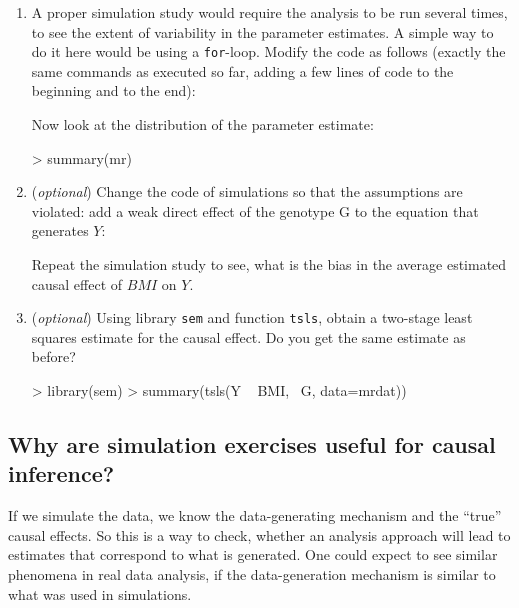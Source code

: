 \begin{enumerate}
\item  A proper simulation study would require the analysis to be run several times, to see the extent of variability in the parameter estimates. 
A simple way to do it here would be using a \verb+for+-loop. Modify the code as follows (exactly the same commands as executed so far, adding a few lines of code to the beginning and to the end):
\begin{Schunk}
\end{Schunk}
Now look at the distribution of the parameter estimate:
\begin{Schunk}
\begin{Sinput}
> summary(mr)    
\end{Sinput}
\end{Schunk}
\item (\textit{optional}) Change the code of simulations so that the assumptions are violated: add a weak direct effect of the genotype G to the equation that generates $Y$:
\begin{Schunk}
\end{Schunk}
Repeat the simulation study to see, what is the bias in the average estimated causal effect of $BMI$ on $Y$.

\item (\textit{optional}) Using library \texttt{sem}  and function \texttt{tsls}, obtain a two-stage least squares estimate for the 
causal effect. Do you get the same estimate as before? 
\begin{Schunk}
\begin{Sinput}
> library(sem)
> summary(tsls(Y ~ BMI, ~G, data=mrdat))
\end{Sinput}
\end{Schunk}
\end{enumerate}
\subsection*{Why are simulation exercises useful for causal inference?}
If we simulate the data, we know the data-generating mechanism and the ``true'' causal effects. So this is a way to check, whether 
an analysis approach will lead to estimates that correspond to what is generated. One could expect to see similar phenomena in real
data analysis, if the data-generation mechanism is similar to what was used in simulations.


